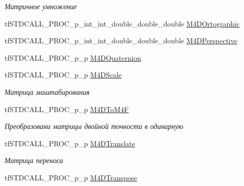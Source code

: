 \begin{DoxyCompactItemize}
\begin{DoxyCompactList}\small\item\em Матричное умножение \end{DoxyCompactList}\item 
tf\-S\-T\-D\-C\-A\-L\-L\-\_\-\-P\-R\-O\-C\-\_\-p\-\_\-int\-\_\-int\-\_\-double\-\_\-double\-\_\-double \hyperlink{structs_functions_vector_c_p_u_a3924547087255c302245a29a460f3aea}{M4\-D\-Ortographic}
\item 
tf\-S\-T\-D\-C\-A\-L\-L\-\_\-\-P\-R\-O\-C\-\_\-p\-\_\-int\-\_\-int\-\_\-double\-\_\-double\-\_\-double \hyperlink{structs_functions_vector_c_p_u_a0d04bc9f719c2c81f2be54011780f0c1}{M4\-D\-Perspective}
\item 
tf\-S\-T\-D\-C\-A\-L\-L\-\_\-\-P\-R\-O\-C\-\_\-p\-\_\-p \hyperlink{structs_functions_vector_c_p_u_a414cbed4b407ccb9add4b84d4b8b9202}{M4\-D\-Quaternion}
\item 
\hypertarget{structs_functions_vector_c_p_u_a8ab05c9bafe438d471076f0d5c038c64}{tf\-S\-T\-D\-C\-A\-L\-L\-\_\-\-P\-R\-O\-C\-\_\-p\-\_\-p \hyperlink{structs_functions_vector_c_p_u_a8ab05c9bafe438d471076f0d5c038c64}{M4\-D\-Scale}}\label{structs_functions_vector_c_p_u_a8ab05c9bafe438d471076f0d5c038c64}

\begin{DoxyCompactList}\small\item\em Матрица маштабирования \end{DoxyCompactList}\item 
\hypertarget{structs_functions_vector_c_p_u_a5d324c10a82932d5632e8efdd6f7a635}{tf\-S\-T\-D\-C\-A\-L\-L\-\_\-\-P\-R\-O\-C\-\_\-p\-\_\-p \hyperlink{structs_functions_vector_c_p_u_a5d324c10a82932d5632e8efdd6f7a635}{M4\-D\-To\-M4\-F}}\label{structs_functions_vector_c_p_u_a5d324c10a82932d5632e8efdd6f7a635}

\begin{DoxyCompactList}\small\item\em Преобразовани матрицы двойной точности в одинарную \end{DoxyCompactList}\item 
\hypertarget{structs_functions_vector_c_p_u_a53e85b57f697f7b7da1c4cc5c162b578}{tf\-S\-T\-D\-C\-A\-L\-L\-\_\-\-P\-R\-O\-C\-\_\-p\-\_\-p \hyperlink{structs_functions_vector_c_p_u_a53e85b57f697f7b7da1c4cc5c162b578}{M4\-D\-Translate}}\label{structs_functions_vector_c_p_u_a53e85b57f697f7b7da1c4cc5c162b578}

\begin{DoxyCompactList}\small\item\em Матрица переноса \end{DoxyCompactList}\item 
\hypertarget{structs_functions_vector_c_p_u_a7042f9a6573017e47fe7af5f93794846}{tf\-S\-T\-D\-C\-A\-L\-L\-\_\-\-P\-R\-O\-C\-\_\-p\-\_\-p \hyperlink{structs_functions_vector_c_p_u_a7042f9a6573017e47fe7af5f93794846}{M4\-D\-Transpose}}\label{structs_functions_vector_c_p_u_a7042f9a6573017e47fe7af5f93794846}


\end{DoxyCompactItemize}
